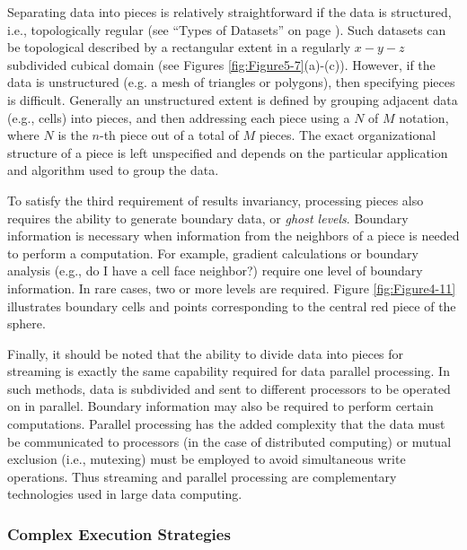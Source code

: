 Separating data into pieces is relatively straightforward if the data is structured, i.e., topologically regular (see ``Types of Datasets'' on page \pageref{sec:types_of_datasets}). Such datasets can be topological described by a rectangular extent in a regularly $x-y-z$ subdivided cubical domain (see Figures \ref{fig:Figure5-7}(a)-(c)). However, if the data is unstructured (e.g. a mesh of triangles or polygons), then specifying pieces is difficult. Generally an unstructured extent is defined by grouping adjacent data (e.g., cells) into pieces, and then addressing each piece using a $N$ of $M$ notation, where $N$ is the $n$-th piece out of a total of $M$ pieces. The exact organizational structure of a piece is left unspecified and depends on the particular application and algorithm used to group the data.

To satisfy the third requirement of results invariancy, processing pieces also requires the ability to generate boundary data, or \emph{ghost levels}. Boundary information is necessary when information from the neighbors of a piece is needed to perform a computation. For example, gradient calculations or boundary analysis (e.g., do I have a cell face neighbor?) require one level of boundary information. In rare cases, two or more levels are required. Figure \ref{fig:Figure4-11} illustrates boundary cells and points corresponding to the central red piece of the sphere.

Finally, it should be noted that the ability to divide data into pieces for streaming is exactly the same capability required for data parallel processing. In such methods, data is subdivided and sent to different processors to be operated on in parallel. Boundary information may also be required to perform certain computations. Parallel processing has the added complexity that the data must be communicated to processors (in the case of distributed computing) or mutual exclusion (i.e., mutexing) must be employed to avoid simultaneous write operations. Thus streaming and parallel processing are complementary technologies used in large data computing.

\subsubsection{Complex Execution Strategies}
\label{subsubsec:complex_execution_strategies}

